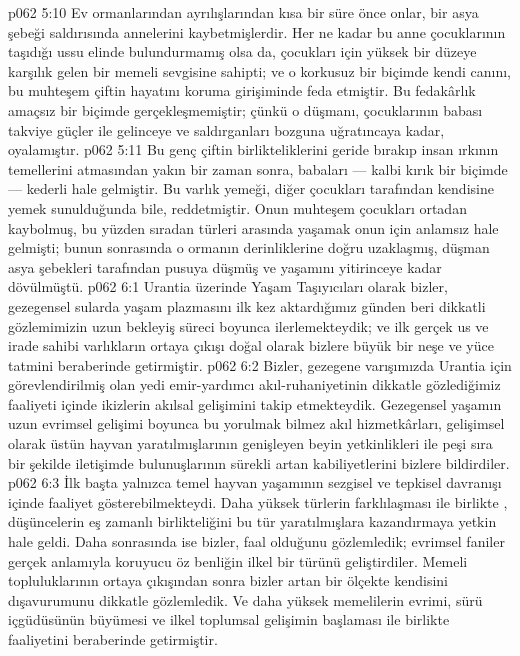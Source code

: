 \vs p062 5:10 Ev ormanlarından ayrılışlarından kısa bir süre önce onlar, bir asya şebeği saldırısında annelerini kaybetmişlerdir. Her ne kadar bu anne çocuklarının taşıdığı ussu elinde bulundurmamış olsa da, çocukları için yüksek bir düzeye karşılık gelen bir memeli sevgisine sahipti; ve o korkusuz bir biçimde kendi canını, bu muhteşem çiftin hayatını koruma girişiminde feda etmiştir. Bu fedakârlık amaçsız bir biçimde gerçekleşmemiştir; çünkü o düşmanı, çocuklarının babası takviye güçler ile gelinceye ve saldırganları bozguna uğratıncaya kadar, oyalamıştır.
\vs p062 5:11 Bu genç çiftin birlikteliklerini geride bırakıp insan ırkının temellerini atmasından yakın bir zaman sonra, babaları --- kalbi kırık bir biçimde --- kederli hale gelmiştir. Bu varlık yemeği, diğer çocukları tarafından kendisine yemek sunulduğunda bile, reddetmiştir. Onun muhteşem çocukları ortadan kaybolmuş, bu yüzden sıradan türleri arasında yaşamak onun için anlamsız hale gelmişti; bunun sonrasında o ormanın derinliklerine doğru uzaklaşmış, düşman asya şebekleri tarafından pusuya düşmüş ve yaşamını yitirinceye kadar dövülmüştü.
\vs p062 6:1 Urantia üzerinde Yaşam Taşıyıcıları olarak bizler, gezegensel sularda yaşam plazmasını ilk kez aktardığımız günden beri dikkatli gözlemimizin uzun bekleyiş süreci boyunca ilerlemekteydik; ve ilk gerçek us ve irade sahibi varlıkların ortaya çıkışı doğal olarak bizlere büyük bir neşe ve yüce tatmini beraberinde getirmiştir.
\vs p062 6:2 Bizler, gezegene varışımızda Urantia için görevlendirilmiş olan yedi emir\hyp{}yardımcı akıl\hyp{}ruhaniyetinin dikkatle gözlediğimiz faaliyeti içinde ikizlerin akılsal gelişimini takip etmekteydik. Gezegensel yaşamın uzun evrimsel gelişimi boyunca bu yorulmak bilmez akıl hizmetkârları, gelişimsel olarak üstün hayvan yaratılmışlarının genişleyen beyin yetkinlikleri ile peşi sıra bir şekilde iletişimde bulunuşlarının sürekli artan kabiliyetlerini bizlere bildirdiler.
\vs p062 6:3 İlk başta yalnızca  temel hayvan yaşamının sezgisel ve tepkisel davranışı içinde faaliyet gösterebilmekteydi. Daha yüksek türlerin farklılaşması ile birlikte , düşüncelerin eş zamanlı birlikteliğini bu tür yaratılmışlara kazandırmaya yetkin hale geldi. Daha sonrasında ise bizler,  faal olduğunu gözlemledik; evrimsel faniler gerçek anlamıyla koruyucu öz benliğin ilkel bir türünü geliştirdiler. Memeli topluluklarının ortaya çıkışından sonra bizler  artan bir ölçekte kendisini dışavurumunu dikkatle gözlemledik. Ve daha yüksek memelilerin evrimi, sürü içgüdüsünün büyümesi ve ilkel toplumsal gelişimin başlaması ile birlikte  faaliyetini beraberinde getirmiştir.
